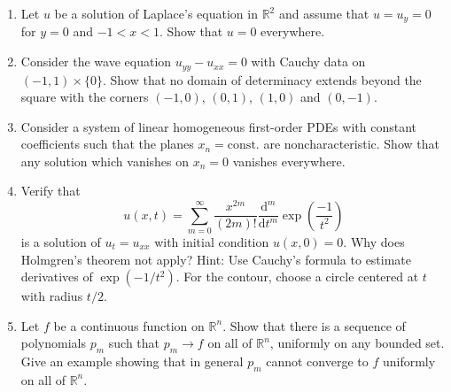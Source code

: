 \begin{enumerate}[label=\thesection.\arabic*.,ref=\thesection.\arabic*,start=18,series=book-problems]

\item\label{ex:laplace-cauchy-uniqueness} Let $u$ be a solution of Laplace's equation in $\mathbb{R}^2$ and assume that $u=u_y=0$ for $y=0$ and $-1<x<1$. Show that $u=0$ everywhere.

\item\label{ex:wave-determinacy-boundary} Consider the wave equation $u_{yy}-u_{xx}=0$ with Cauchy data on $(-1,1)\times\{0\}$. Show that no domain of determinacy extends beyond the square with the corners $(-1,0)$, $(0,1)$, $(1,0)$ and $(0,-1)$.

\item\label{ex:constant-coefficient-cauchy-uniqueness} Consider a system of linear homogeneous first-order PDEs with constant coefficients such that the planes $x_n=\mathrm{const.}$ are noncharacteristic. Show that any solution which vanishes on $x_n=0$ vanishes everywhere.

\item\label{ex:nonunique-zero-initial-heat-solution} Verify that
\begin{equation}\label{eq:flat-in-time-heat-series}
u(x,t)=\sum_{m=0}^{\infty}\dfrac{x^{2m}}{(2m)!}\dfrac{\mathrm{d}^m}{\mathrm{d}t^m}\exp\left(\dfrac{-1}{t^2}\right)
\end{equation}
is a solution of $u_t=u_{xx}$ with initial condition $u(x,0)=0$. Why does Holmgren's theorem not apply? Hint: Use Cauchy's formula to estimate derivatives of $\exp(-1/t^2)$. For the contour, choose a circle centered at $t$ with radius $t/2$.

\item\label{ex:polynomial-approximation-on-bounded-sets} Let $f$ be a continuous function on $\mathbb{R}^n$. Show that there is a sequence of polynomials $p_m$ such that $p_m\to f$ on all of $\mathbb{R}^n$, uniformly on any bounded set. Give an example showing that in general $p_m$ cannot converge to $f$ uniformly on all of $\mathbb{R}^n$.

\end{enumerate}
